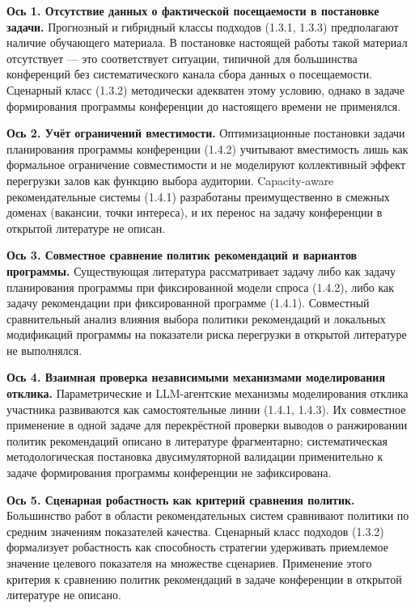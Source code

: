 \textbf{Ось 1. Отсутствие данных о фактической посещаемости в постановке задачи.} Прогнозный и гибридный классы подходов (1.3.1, 1.3.3) предполагают наличие обучающего материала. В постановке настоящей работы такой материал отсутствует --- это соответствует ситуации, типичной для большинства конференций без систематического канала сбора данных о посещаемости. Сценарный класс (1.3.2) методически адекватен этому условию, однако в задаче формирования программы конференции до настоящего времени не применялся.

\textbf{Ось 2. Учёт ограничений вместимости.} Оптимизационные постановки задачи планирования программы конференции (1.4.2) учитывают вместимость лишь как формальное ограничение совместимости и не моделируют коллективный эффект перегрузки залов как функцию выбора аудитории. Capacity-aware рекомендательные системы (1.4.1) разработаны преимущественно в смежных доменах (вакансии, точки интереса), и их перенос на задачу конференции в открытой литературе не описан.

\textbf{Ось 3. Совместное сравнение политик рекомендаций и вариантов программы.} Существующая литература рассматривает задачу либо как задачу планирования программы при фиксированной модели спроса (1.4.2), либо как задачу рекомендации при фиксированной программе (1.4.1). Совместный сравнительный анализ влияния выбора политики рекомендаций и локальных модификаций программы на показатели риска перегрузки в открытой литературе не выполнялся.

\textbf{Ось 4. Взаимная проверка независимыми механизмами моделирования отклика.} Параметрические и LLM-агентские механизмы моделирования отклика участника развиваются как самостоятельные линии (1.4.1, 1.4.3). Их совместное применение в одной задаче для перекрёстной проверки выводов о ранжировании политик рекомендаций описано в литературе фрагментарно; систематическая методологическая постановка двусимуляторной валидации применительно к задаче формирования программы конференции не зафиксирована.

\textbf{Ось 5. Сценарная робастность как критерий сравнения политик.} Большинство работ в области рекомендательных систем сравнивают политики по средним значениям показателей качества. Сценарный класс подходов (1.3.2) формализует робастность как способность стратегии удерживать приемлемое значение целевого показателя на множестве сценариев. Применение этого критерия к сравнению политик рекомендаций в задаче конференции в открытой литературе не описано.


